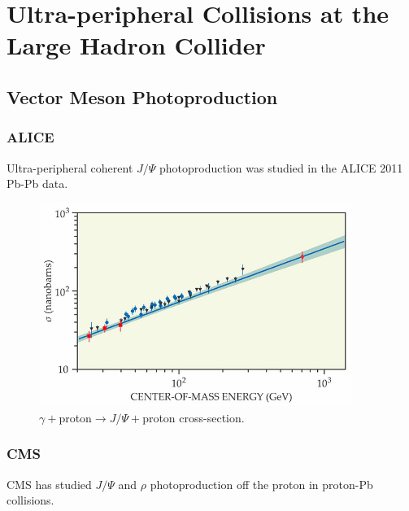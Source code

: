 
\chapter{Ultra-peripheral Collisions at the Large Hadron Collider}

\section{Vector Meson Photoproduction}

\subsection{ALICE}

Ultra-peripheral coherent $J/\Psi$ photoproduction was studied in the ALICE 2011 Pb-Pb data. 

\begin{figure}[h!]
\begin{centering}
\includegraphics[width=4in]{Chapter2/importfigs/aliceData1.jpeg}
\par\end{centering}
\caption{$\gamma +$proton$\rightarrow J/\Psi +$proton cross-section. \label{fig:aliceData1}}
\end{figure}

\subsection{CMS}

CMS has studied $J/\Psi$ and $\rho$ photoproduction off the proton in proton-Pb collisions. 


